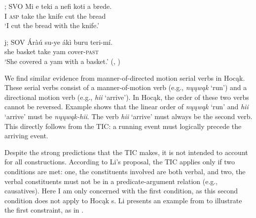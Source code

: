 \documentclass[output=paper]{LSP/langsci}
\begin{document}
\begin{exe}
\ex\label{ex:rosen:35}
\begin{xlist}

\ex {}; SVO
\gll Mi e teki a nefi koti a brede. \\
I \textsc{asp} take the knife cut the bread \\
\glt `I cut the bread with the knife.'

\ex {}j; SOV
 \gll \'Aràú su-ye ákì buru teri-mí. \\
she basket take yam cover-\textsc{past}\\
\glt `She covered a yam with a basket.' (\citealt[500]{Li1993}, )

\end{xlist}
\end{exe}

We find similar evidence from manner-of-directed motion serial verbs in Hocąk. These serial verbs consist of a manner-of-motion verb (e.g., \textit{nųųwąk} `run') and a directional motion verb (e.g., \textit{hii} `arrive'). In Hocąk, the order of these two verbs cannot be reversed. Example  shows that the linear order of \textit{nųųwąk} `run' and \textit{hii} `arrive' must be \textit{nųųwąk-hii}. The verb \textit{hii} `arrive' must always be the second verb. This directly follows from the TIC: a running event must logically precede the arriving event.

\begin{exe}
\ex\label{ex:rosen:36}
\begin{xlist}



\end{xlist}
\end{exe}

Despite the strong predictions that the TIC makes, it is not intended to account for all  constructions. According to Li's proposal, the TIC applies only if two conditions are met: one, the constituents involved are both verbal, and two, the verbal constituents must not be in a predicate-argument relation (e.g., causatives). Here I am only concerned with the first condition, as this second condition does not apply to Hocąk s. Li presents an example from  to illustrate the first constraint, as in .
\end{document}

